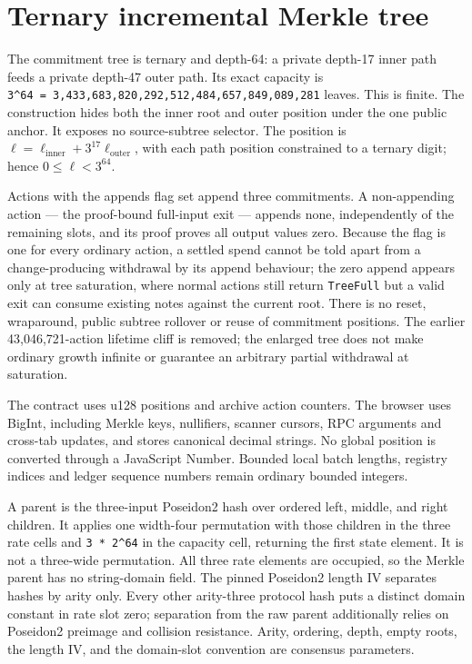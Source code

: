 \documentclass[11pt,letterpaper]{article}
\begin{document}
\section{Ternary incremental Merkle
tree}\label{ternary-incremental-merkle-tree}

The commitment tree is ternary and depth-64: a private depth-17 inner
path feeds a private depth-47 outer path. Its exact capacity is
\texttt{3\^{}64\ =\ 3,433,683,820,292,512,484,657,849,089,281} leaves.
This is finite. The construction hides both the inner root and outer
position under the one public anchor. It exposes no source-subtree
selector. The position is
\(\ell = \ell_{\mathrm{inner}} + 3^{17}\ell_{\mathrm{outer}}\), with
each path position constrained to a ternary digit; hence
\(0 \leq \ell < 3^{64}\).

Actions with the appends flag set append three commitments. A
non-appending action --- the proof-bound full-input exit --- appends
none, independently of the remaining slots, and its proof proves all
output values zero. Because the flag is one for every ordinary action, a
settled spend cannot be told apart from a change-producing withdrawal by
its append behaviour; the zero append appears only at tree saturation,
where normal actions still return \texttt{TreeFull} but a valid exit can
consume existing notes against the current root. There is no reset,
wraparound, public subtree rollover or reuse of commitment positions.
The earlier 43,046,721-action lifetime cliff is removed; the enlarged
tree does not make ordinary growth infinite or guarantee an arbitrary
partial withdrawal at saturation.

The contract uses u128 positions and archive action counters. The
browser uses BigInt, including Merkle keys, nullifiers, scanner cursors,
RPC arguments and cross-tab updates, and stores canonical decimal
strings. No global position is converted through a JavaScript Number.
Bounded local batch lengths, registry indices and ledger sequence
numbers remain ordinary bounded integers.

A parent is the three-input Poseidon2 hash over ordered left, middle,
and right children. It applies one width-four permutation with those
children in the three rate cells and \texttt{3\ *\ 2\^{}64} in the
capacity cell, returning the first state element. It is not a three-wide
permutation. All three rate elements are occupied, so the Merkle parent
has no string-domain field. The pinned Poseidon2 length IV separates
hashes by arity only. Every other arity-three protocol hash puts a
distinct domain constant in rate slot zero; separation from the raw
parent additionally relies on Poseidon2 preimage and collision
resistance. Arity, ordering, depth, empty roots, the length IV, and the
domain-slot convention are consensus parameters.
\end{document}
